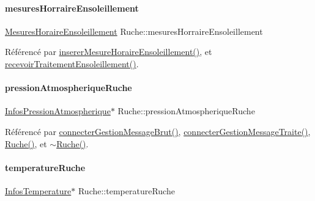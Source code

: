 \paragraph{\texorpdfstring{mesures\+Horraire\+Ensoleillement}{mesuresHorraireEnsoleillement}}
{\footnotesize\ttfamily \hyperlink{struct_mesures_horaire_ensoleillement}{Mesures\+Horaire\+Ensoleillement} Ruche\+::mesures\+Horraire\+Ensoleillement\hspace{0.3cm}{\ttfamily [private]}}



Référencé par \hyperlink{class_ruche_a658234b9d96541d204b95b74556742b6}{inserer\+Mesure\+Horaire\+Ensoleillement()}, et \hyperlink{class_ruche_a2ac5766ce8652084f034c498691488ea}{recevoir\+Traitement\+Ensoleillement()}.

\mbox{\label{class_ruche_a06efa82900dc7e31ed67c826d3157ae0}} 
\paragraph{\texorpdfstring{pression\+Atmospherique\+Ruche}{pressionAtmospheriqueRuche}}
{\footnotesize\ttfamily \hyperlink{class_infos_pression_atmospherique}{Infos\+Pression\+Atmospherique}$\ast$ Ruche\+::pression\+Atmospherique\+Ruche\hspace{0.3cm}{\ttfamily [private]}}



Référencé par \hyperlink{class_ruche_a9c8e7e3b529676c6dda3d936370af00f}{connecter\+Gestion\+Message\+Brut()}, \hyperlink{class_ruche_a20ec8c6dc931218e5cf682050fe845d9}{connecter\+Gestion\+Message\+Traite()}, \hyperlink{class_ruche_a8b4ee3752d984c5acee93b990db7939a}{Ruche()}, et \hyperlink{class_ruche_ad3f950d0731f9801f06dd6ae09f2e5fa}{$\sim$\+Ruche()}.

\mbox{\label{class_ruche_af721fb92f801a9b1f3ef3aa9867cf3de}} 
\paragraph{\texorpdfstring{temperature\+Ruche}{temperatureRuche}}
{\footnotesize\ttfamily \hyperlink{class_infos_temperature}{Infos\+Temperature}$\ast$ Ruche\+::temperature\+Ruche\hspace{0.3cm}{\ttfamily [private]}}



